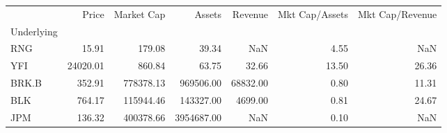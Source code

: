 \begin{tabular}{lrrrrrr}
\toprule
{} &     Price &  Market Cap &      Assets &   Revenue &  Mkt Cap/Assets &  Mkt Cap/Revenue \\
Underlying &           &             &             &           &                 &                  \\
\midrule
RNG        &     15.91 &      179.08 &       39.34 &       NaN &            4.55 &              NaN \\
YFI        &  24020.01 &      860.84 &       63.75 &     32.66 &           13.50 &            26.36 \\
BRK.B      &    352.91 &   778378.13 &   969506.00 &  68832.00 &            0.80 &            11.31 \\
BLK        &    764.17 &   115944.46 &   143327.00 &   4699.00 &            0.81 &            24.67 \\
JPM        &    136.32 &   400378.66 &  3954687.00 &       NaN &            0.10 &              NaN \\
\bottomrule
\end{tabular}
